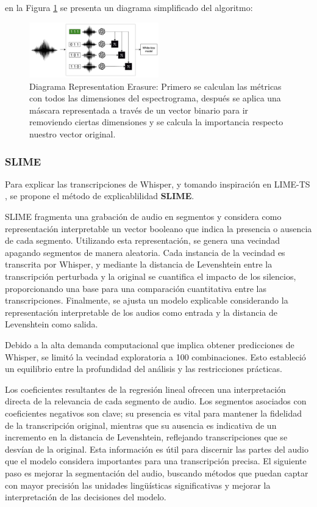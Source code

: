 \documentclass[conference]{IEEEtran}
\begin{document}
en la Figura \ref{fig:re-diagram} se presenta un diagrama simplificado del algoritmo:

\begin{figure}[ht]
\centerline{\includegraphics[width=0.5\textwidth]{images/RE-Diagram.png}}
\caption{Diagrama Representation Erasure: Primero se calculan las métricas con todos las dimensiones del espectrograma, después se aplica una máscara representada a través de un vector binario para ir removiendo ciertas dimensiones y se calcula la importancia respecto nuestro vector original.}
\label{fig:re-diagram}
\end{figure}

\subsubsection{SLIME}

Para explicar las transcripciones de Whisper, y tomando inspiración en LIME-TS \cite{wu2023trust}, se propone el método de explicablilidad \textbf{SLIME}.

SLIME fragmenta una grabación de audio en segmentos y considera como representación interpretable un vector booleano que indica la presencia o ausencia de cada segmento. Utilizando esta representación, se genera una vecindad apagando segmentos de manera aleatoria. Cada instancia de la vecindad es transcrita por Whisper, y mediante la distancia de Levenshtein entre la transcripción perturbada y la original se cuantifica el impacto de los silencios, proporcionando una base para una comparación cuantitativa entre las transcripciones. Finalmente, se ajusta un modelo explicable considerando la representación interpretable de los audios como entrada y la distancia de Levenshtein como salida.

Debido a la alta demanda computacional que implica obtener predicciones de Whisper, se limitó la vecindad exploratoria a 100 combinaciones. Esto estableció un equilibrio entre la profundidad del análisis y las restricciones prácticas.

Los coeficientes resultantes de la regresión lineal ofrecen una interpretación directa de la relevancia de cada segmento de audio. Los segmentos asociados con coeficientes negativos son clave; su presencia es vital para mantener la fidelidad de la transcripción original, mientras que su ausencia es indicativa de un incremento en la distancia de Levenshtein, reflejando transcripciones que se desvían de la original. Esta información es útil para discernir las partes del audio que el modelo considera importantes para una transcripción precisa. El siguiente paso es mejorar la segmentación del audio, buscando métodos que puedan captar con mayor precisión las unidades lingüísticas significativas y mejorar la interpretación de las decisiones del modelo.
\end{document}
